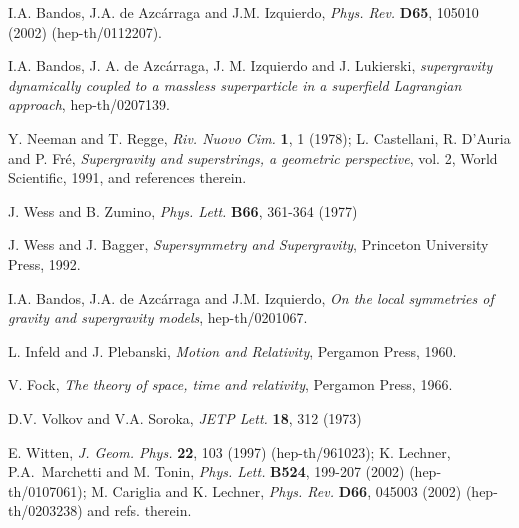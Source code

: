 \documentclass[a4paper,11pt]{article}
\begin{document}
{\begin{thebibliography}{99}
I.A. Bandos, J.A. de Azc\'arraga and J.M. Izquierdo,  
{\em Phys. Rev.} {\bf D65}, 105010 (2002) (hep-th/0112207). 

I.A. Bandos, J. A. de Azc\'arraga, J. M. Izquierdo and J. Lukierski, 
{\sl {}\coordHE{} supergravity dynamically coupled to 
a massless superparticle in a superfield Lagrangian approach}, 
hep-th/0207139. 

Y. Neeman and T. Regge, 
{\em Riv. Nuovo Cim.} {\bf 1}, 1 (1978); 
L. Castellani, R. D'Auria and  P. Fr\'e, {\sl Supergravity and
superstrings, a geometric perspective}, vol. 2, World Scientific, 
1991, and references therein. 

 J. Wess and B. Zumino, 
{\em Phys. Lett.} {\bf B66}, 361-364 (1977) 

J. Wess and J. Bagger, {\sl Supersymmetry and Supergravity}, 
Princeton University Press, 1992.

I.A. Bandos, J.A. de Azc\'arraga and J.M. Izquierdo,  
{\sl On the local symmetries of gravity and supergravity models}, 
hep-th/0201067.

L. Infeld and J. Plebanski, {\it Motion and Relativity}, 
Pergamon Press, 1960.

V. Fock, {\it The theory of space, time and relativity}, Pergamon Press, 
1966.

D.V. Volkov and V.A. Soroka, {\em JETP Lett.} {\bf 18}, 312 (1973)

E. Witten, 
{\em J. Geom. Phys.} {\bf  22}, 103 (1997) (hep-th/961023);  
K. Lechner, P.A.~Marchetti and M. Tonin, 
{\em Phys. Lett.} {\bf B524}, 199-207 (2002) (hep-th/0107061);  
M. Cariglia and K. Lechner, 
{\em Phys. Rev.} {\bf D66}, 045003 (2002) 
(hep-th/0203238) and refs. therein. 

\end{thebibliography}
}
\end{document}
